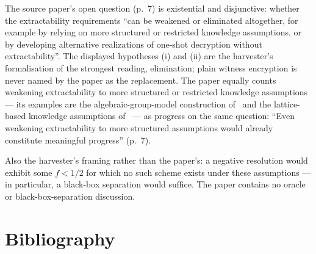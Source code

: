 \documentclass{aicr-conjecture}
\begin{document}
\begin{remark}\label{rem:scope}
The source paper's open question (p.~7) is existential and
disjunctive: whether the extractability requirements ``can be weakened
or eliminated altogether, for example by relying on more structured or
restricted knowledge assumptions, or by developing alternative
realizations of one-shot decryption without extractability''. The
displayed hypotheses (i) and (ii) are the harvester's formalisation of
the strongest reading, elimination; plain witness encryption is never
named by the paper as the replacement. The paper equally counts
weakening extractability to more structured or restricted knowledge
assumptions --- its examples are the algebraic-group-model
construction of~\cite{FHAS24} and the lattice-based knowledge
assumptions of~\cite{ACL+22} --- as progress on the same question:
``Even weakening extractability to more structured assumptions would
already constitute meaningful progress'' (p.~7).

Also the harvester's framing rather than the paper's: a negative
resolution would exhibit some $f < 1/2$ for which no such scheme
exists under these assumptions --- in particular, a black-box
separation would suffice. The paper contains no oracle or
black-box-separation discussion.
\end{remark}

\section{Bibliography}
\end{document}

